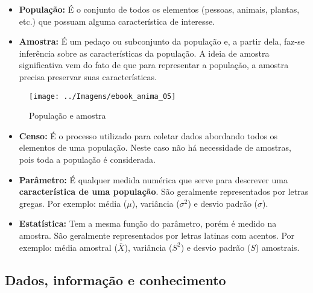 \documentclass[12pt,]{style/krantz}
\theoremstyle{definition}
\theoremstyle{definition}
\theoremstyle{definition}
\theoremstyle{remark}
\begin{document}
\begin{itemize}
\item
  \textbf{População:} É o conjunto de todos os elementos (pessoas, animais, plantas, etc.) que possuam alguma característica de interesse.
\item
  \textbf{Amostra:} É um pedaço ou subconjunto da população e, a partir dela, faz-se inferência sobre as características da população. A ideia de amostra significativa vem do fato de que para representar a população, a amostra precisa preservar suas características.
\end{itemize}

\begin{figure}[H]

{\centering \texttt{[image: ../Imagens/ebook\_anima\_05]} 

}

\caption{População e amostra}\label{fig:fig05}
\end{figure}

\begin{itemize}
\item
  \textbf{Censo:} É o processo utilizado para coletar dados abordando todos os elementos de uma população. Neste caso não há necessidade de amostras, pois toda a população é considerada.
\item
  \textbf{Parâmetro: } É qualquer medida numérica que serve para descrever uma \textbf{característica de uma população}. São geralmente representados por letras gregas. Por exemplo: média (\(\mu\)), variância (\(\sigma^2\)) e desvio padrão (\(\sigma\)).
\item
  \textbf{Estatística: } Tem a mesma função do parâmetro, porém é medido na amostra. São geralmente representados por letras latinas com acentos. Por exemplo: média amostral (\(\bar X\)), variância (\(S^2\)) e desvio padrão (\(S\)) amostrais.
\end{itemize}

\hypertarget{dados-informacao-e-conhecimento}{%
\subsection{Dados, informação e conhecimento}\label{dados-informacao-e-conhecimento}}
\end{document}
